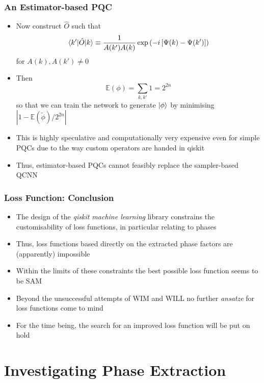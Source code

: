 \documentclass{beamer}
\begin{document}
\begin{frame}
\frametitle{An Estimator-based PQC}
\begin{itemize}
\item Now construct $\hat{O}$ such that 
\begin{equation}
\braket{k' | \hat{O} | k} \equiv \frac{1}{A(k')A(k)}  \exp \left( - i \left[ \Psi(k) - \Psi(k') \right] \right)
\end{equation}
for $A(k), A(k') \neq 0$
\item Then 
\begin{equation}
\mathbb{E}(\phi)= \sum_{k,k'} 1 =2^{2n}
\end{equation}
so that we can train the network to generate $\ket{\phi}$ by minimising $|1-\mathbb{E}(\tilde{\phi}) / 2^{2n}|$
\item \alert{This is highly speculative} and computationally very expensive even for simple PQCs due to the way custom operators are handed in qiskit
\item Thus, \alert{estimator-based PQCs cannot feasibly replace the sampler-based QCNN}
\end{itemize}
\end{frame}

\begin{frame}
\frametitle{Loss Function: Conclusion}
\begin{itemize}
\item The design of the \emph{qiskit machine learning} library \alert{constrains the customisability} of loss functions, in particular relating to phases 
\item Thus, \alert{loss functions based directly on the extracted phase} factors are (apparently) \alert{impossible} 
\item Within the limits of these constraints the \alert{best} possible loss function seems to be \alert{SAM} 
\item Beyond the unsuccessful attempts of WIM and WILL no further  \emph{ansatze} for loss functions come to mind 
\item For the time being, the search for an improved loss function will be \alert{put on hold}
\end{itemize}
\end{frame}

\section{Investigating Phase Extraction}
\end{document}
